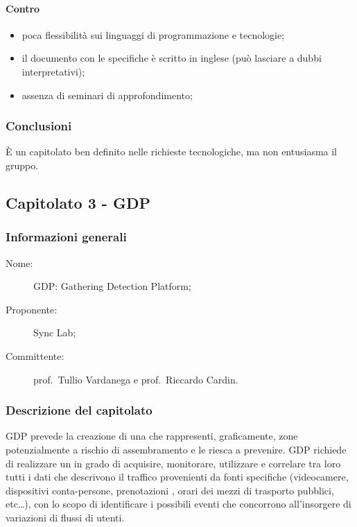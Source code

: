\paragraph*{Contro}
\begin{itemize}
	\item poca flessibilità sui linguaggi di programmazione e tecnologie;
	\item il documento con le specifiche è scritto in inglese (può lasciare a dubbi interpretativi);
	\item assenza di seminari di approfondimento;
\end{itemize}
\subsubsection{Conclusioni}
È un capitolato ben definito nelle richieste tecnologiche, ma non entusiasma il gruppo.

\subsection{Capitolato 3 - GDP}
\subsubsection{Informazioni generali}
\begin{description}
	\item[Nome:] GDP: Gathering Detection Platform;
	\item[Proponente:] Sync Lab;
	\item[Committente:] prof.~Tullio Vardanega e prof.~Riccardo Cardin.
\end{description}
\subsubsection{Descrizione del capitolato}
GDP prevede la creazione di una  che rappresenti, graficamente, zone potenzialmente a rischio di assembramento e le riesca a prevenire. GDP richiede di realizzare un  in grado di acquisire, monitorare, utilizzare e correlare tra loro tutti i dati che descrivono il traffico provenienti da fonti specifiche (videocamere, dispositivi conta-persone, prenotazioni , orari dei mezzi di trasporto pubblici, etc\dots), con lo scopo di identificare i possibili eventi che concorrono all'insorgere di variazioni di flussi di utenti.
